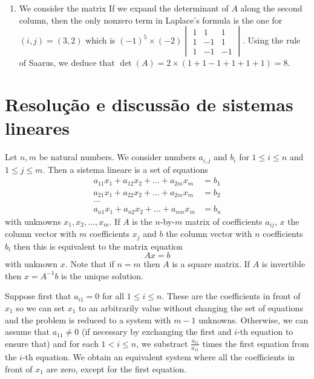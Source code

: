 \begin{enumerate}
\item We consider the matrix
  If we expand the determinant of $A$ along the second column, then
  the only nonzero term in Laplace's formula
  is the one for $(i,j) = (3,2)$ which is
  ${(-1)}^5 \times {(-2)} \begin{vmatrix}
  1 & 1 & 1 \\
  1 & -1 & 1 \\
  1 & -1 & -1 \end{vmatrix}$.
  Using the rule of Saarus, we deduce that
  $\det{(A)} = 2 \times \left(1 + 1 - 1 + 1 + 1 + 1\right) = 8$.
\end{enumerate}

\section{Resolução e discussão de sistemas lineares}

Let $n, m$ be natural numbers. We consider numbers
$a_{i,j}$ and $b_i$ for $1 \leq i \leq n$ and $1 \leq j \leq m$.
Then a sistema lineare is a set of equations
$$\begin{aligned}
    a_{11} x_1 + a_{12} x_2 + \dots + a_{2m} x_m &= b_1 \\
    a_{21} x_1 + a_{22} x_2 + \dots + a_{2m} x_m &= b_2 \\
    \dots \\
    a_{n1} x_1 + a_{n2} x_2 + \dots + a_{nm} x_m &= b_n
  \end{aligned}$$
with unknowns $x_1, x_2, \dots, x_m$. If $A$ is the $n$-by-$m$
matrix of coefficients $a_{ij}$,
$x$ the column vector with $m$ coefficients $x_j$ and
$b$ the column vector with $n$ coefficients $b_i$ then this is equivalent to
the matrix equation
$$Ax = b$$
with unknown $x$. Note that if $n = m$ then $A$ is a square matrix.
If $A$ is invertible then $x = A^{-1} b$ is the unique solution.

Suppose first that $a_{i1} = 0$ for all $1 \leq i \leq n$. These are the
coefficients in front of $x_1$ so we can set $x_1$ to an arbitrarily value
without changing the set of equations and the problem is reduced to a system
with $m-1$ unknowns.
Otherwise, we can assume that $a_{11} \neq 0$ (if necessary by exchanging
the first and $i$-th equation to ensure that) and for each $1 < i \leq n$, we
substract $\frac{a_{i1}}{a_{11}}$ times the first equation from the $i$-th
equation. We obtain an equivalent system where all the coefficients in front
of $x_1$ are zero, except for the first equation.

